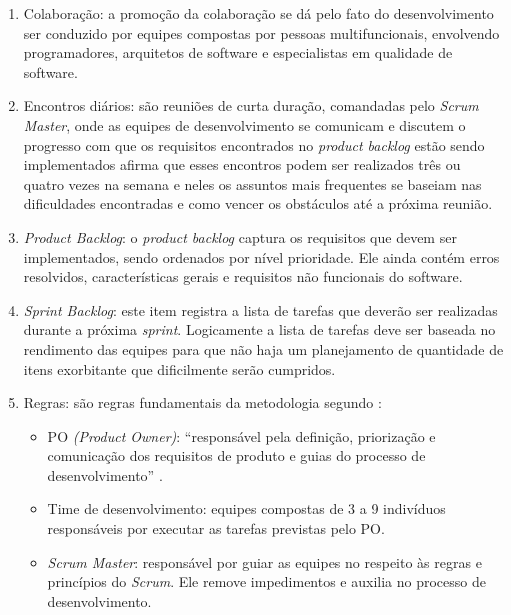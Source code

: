 \begin{enumerate}
 \item Colaboração: a promoção da colaboração se dá pelo fato do desenvolvimento ser conduzido por equipes compostas por pessoas multifuncionais, envolvendo programadores, arquitetos de software e especialistas em qualidade de software.
 
 \item Encontros diários: são reuniões de curta duração, comandadas pelo \textit{Scrum Master}, onde as equipes de desenvolvimento se comunicam e discutem o progresso com que os requisitos encontrados no \textit{product backlog} estão sendo implementados \cite{rising2000scrum} afirma que esses encontros podem ser realizados três ou quatro vezes na semana e neles os assuntos mais frequentes se baseiam nas dificuldades encontradas e como vencer os obstáculos até a próxima reunião.
 
 \item \textit{Product Backlog}: o \textit{product backlog} captura os requisitos que devem ser implementados, sendo ordenados por nível prioridade. Ele ainda contém erros resolvidos, características gerais e requisitos não funcionais do software.
 
 \item \textit{Sprint Backlog}: este item registra a lista de tarefas que deverão ser realizadas durante a próxima \textit{sprint}. Logicamente a lista de tarefas deve ser baseada no rendimento das equipes para que não haja um planejamento de quantidade de itens exorbitante que dificilmente serão cumpridos. 
 
 \item Regras: são regras fundamentais da metodologia segundo :
 \begin{itemize}
  \item PO \textit{(Product Owner)}: ``responsável pela definição, priorização e comunicação dos requisitos de produto e guias do processo de desenvolvimento'' \cite[~p. 3, tradução nossa]{matharu2015empirical}.
  
  \item Time de desenvolvimento: equipes compostas de 3 a 9 indivíduos responsáveis por executar as tarefas previstas pelo PO.
 
  \item \textit{Scrum Master}: responsável por guiar as equipes no respeito às regras e princípios do \textit{Scrum}. Ele remove impedimentos e auxilia no processo de desenvolvimento.
  
 \end{itemize}
 
\end{enumerate}


